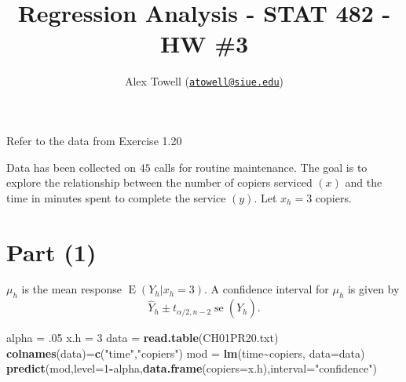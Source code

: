 \documentclass[
]{article}
\title{Regression Analysis - STAT 482 - HW \#3}
\author{Alex Towell
(\href{mailto:atowell@siue.edu}{\nolinkurl{atowell@siue.edu}})}
\date{}
\newenvironment{Shaded}{\begin{snugshade}}{\end{snugshade}}
\newcommand{\AttributeTok}[1]{\textcolor[rgb]{0.13,0.29,0.53}{#1}}
\newcommand{\DecValTok}[1]{\textcolor[rgb]{0.00,0.00,0.81}{#1}}
\newcommand{\FunctionTok}[1]{\textcolor[rgb]{0.13,0.29,0.53}{\textbf{#1}}}
\newcommand{\NormalTok}[1]{#1}
\newcommand{\OtherTok}[1]{\textcolor[rgb]{0.56,0.35,0.01}{#1}}
\newcommand{\SpecialCharTok}[1]{\textcolor[rgb]{0.81,0.36,0.00}{\textbf{#1}}}
\newcommand{\StringTok}[1]{\textcolor[rgb]{0.31,0.60,0.02}{#1}}
\begin{document}
\maketitle

\newsavebox{\selvestebox}
\newenvironment{colbox}[1]
  {\newcommand\colboxcolor{#1}%
   \begin{lrbox}{\selvestebox}%
   \begin{minipage}{\dimexpr\columnwidth-2\fboxsep\relax}}
  {\end{minipage}\end{lrbox}%
   \begin{center}
   \colorbox[HTML]{\colboxcolor}{\usebox{\selvestebox}}
   \end{center}}

\newcommand{\ssx}{\rm{SS}_x}
\newcommand{\var}{\operatorname{V}}
\newcommand{\sd}{\operatorname{sd}}
\newcommand{\expect}{\operatorname{E}}
\newcommand{\corr}{\operatorname{Corr}}
\newcommand{\cov}{\operatorname{Cov}}
\newcommand{\ssr}{\operatorname{ssr}}
\newcommand{\se}{\operatorname{se}}
\newcommand{\mat}[1]{\mathbf{#1}}
\newcommand{\eval}[2]{\left. #1 \right\vert_{#2}}

Refer to the data from Exercise 1.20

Data has been collected on \(45\) calls for routine maintenance. The
goal is to explore the relationship between the number of copiers
serviced \((x)\) and the time in minutes spent to complete the service
\((y)\). Let \(x_h = 3\) copiers.

\hypertarget{part-1}{%
\section{Part (1)}\label{part-1}}


\(\mu_h\) is the mean response \(\operatorname{E}(Y_h|x_h=3)\). A
confidence interval for \(\mu_h\) is given by \[
  \hat{Y}_h \pm t_{\alpha/2,n-2} \operatorname{se}(\hat{Y}_h).
\]

\begin{Shaded}
\begin{Highlighting}[]
\NormalTok{alpha }\OtherTok{=}\NormalTok{ .}\DecValTok{05}
\NormalTok{x.h }\OtherTok{=} \DecValTok{3}
\NormalTok{data }\OtherTok{=} \FunctionTok{read.table}\NormalTok{(}\StringTok{\textquotesingle{}CH01PR20.txt\textquotesingle{}}\NormalTok{)}
\FunctionTok{colnames}\NormalTok{(data)}\OtherTok{=}\FunctionTok{c}\NormalTok{(}\StringTok{"time"}\NormalTok{,}\StringTok{"copiers"}\NormalTok{)}
\NormalTok{mod }\OtherTok{=} \FunctionTok{lm}\NormalTok{(time}\SpecialCharTok{\textasciitilde{}}\NormalTok{copiers, }\AttributeTok{data=}\NormalTok{data)}
\FunctionTok{predict}\NormalTok{(mod,}\AttributeTok{level=}\DecValTok{1}\SpecialCharTok{{-}}\NormalTok{alpha,}\FunctionTok{data.frame}\NormalTok{(}\AttributeTok{copiers=}\NormalTok{x.h),}\AttributeTok{interval=}\StringTok{"confidence"}\NormalTok{)}
\end{Highlighting}
\end{Shaded}
\end{document}
